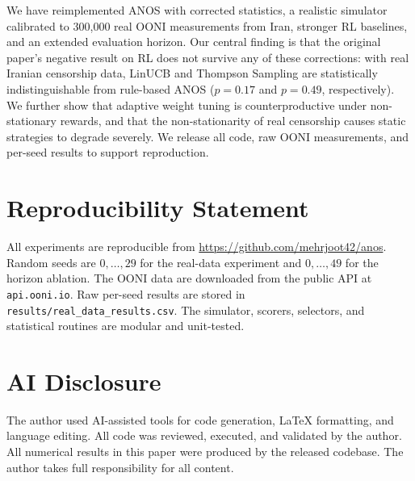 \documentclass[11pt,a4paper]{article}
\begin{document}
We have reimplemented ANOS with corrected statistics, a realistic
simulator calibrated to 300{,}000 real OONI measurements from Iran,
stronger RL baselines, and an extended evaluation horizon. Our
central finding is that the original paper's negative result on RL
does not survive any of these corrections: with real Iranian
censorship data, LinUCB and Thompson Sampling are statistically
indistinguishable from rule-based ANOS ($p = 0.17$ and $p = 0.49$,
respectively). We further show that adaptive weight tuning is
counterproductive under non-stationary rewards, and that the
non-stationarity of real censorship causes static strategies to
degrade severely. We release all code, raw OONI measurements, and
per-seed results to support reproduction.

\section*{Reproducibility Statement}

All experiments are reproducible from
\url{https://github.com/mehrjoot42/anos}. Random seeds are
$0,\dots,29$ for the real-data experiment and $0,\dots,49$ for the
horizon ablation. The OONI data are downloaded from the public API
at \texttt{api.ooni.io}. Raw per-seed results are stored in
\texttt{results/real\_data\_results.csv}. The simulator, scorers,
selectors, and statistical routines are modular and unit-tested.

\section*{AI Disclosure}

The author used AI-assisted tools for code generation, LaTeX
formatting, and language editing. All code was reviewed, executed,
and validated by the author. All numerical results in this paper
were produced by the released codebase. The author takes full
responsibility for all content.
\end{document}
